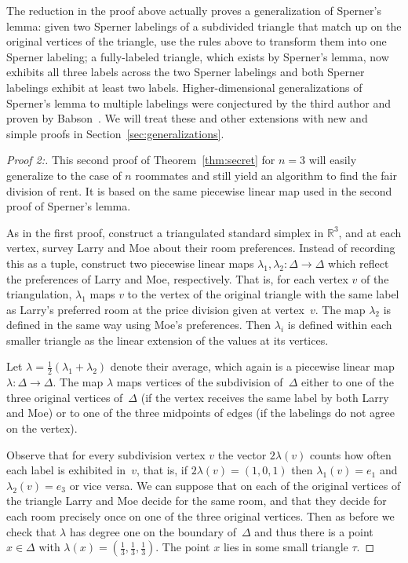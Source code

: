 \documentclass[a4paper,10pt,reqno, english]{amsart}
\theoremstyle{plain}
\theoremstyle{definition}
\newcommand{\R}{\mathbb{R}}
\begin{document}
The reduction in the proof above actually proves a generalization of Sperner's lemma: given two Sperner labelings of a subdivided triangle that
match up on the original vertices of the triangle, use the rules above to transform them into one Sperner labeling; a fully-labeled triangle, which exists
by Sperner's lemma, now exhibits all three labels across the two Sperner labelings and both Sperner labelings exhibit at least two labels.
Higher-dimensional generalizations of Sperner's lemma to multiple labelings were conjectured by the third author and proven by Babson~\cite{babson2012}.
We will treat these and other extensions with new and simple proofs in Section~\ref{sec:generalizations}.

\begin{proof}[Proof 2:]	
	This second proof of Theorem~\ref{thm:secret} for $n=3$ will easily generalize to the case of $n$ roommates and still yield an algorithm to find the fair division of rent. It is based on the same piecewise linear map used in the second proof of Sperner's lemma.
	
	As in the first proof, construct a triangulated standard simplex in $\R^3$, and at each vertex, survey Larry and Moe about their room preferences. Instead of recording this as a tuple, construct two piecewise linear maps $\lambda_1, \lambda_2\colon \Delta \longrightarrow \Delta$ which reflect the preferences of Larry and Moe, respectively. That is, for each vertex $v$ of the triangulation, $\lambda_1$ maps $v$ to the vertex of the original triangle with the same label as Larry's preferred room at the price division given at vertex~$v$. The map $\lambda_2$ is defined in the same way using Moe's preferences. Then $\lambda_i$ is defined within each smaller triangle as the linear extension of the values at its vertices.
	
	Let $\lambda = \frac12(\lambda_1+\lambda_2)$ denote their average, which again is a piecewise linear map $\lambda\colon \Delta \longrightarrow \Delta$.
	The map $\lambda$ maps vertices of the subdivision of~$\Delta$ either to one of the three original vertices of~$\Delta$ (if the vertex receives
	the same label by both Larry and Moe) or to one of the three midpoints of edges (if the labelings do not agree on the vertex).
	
	Observe that for every subdivision vertex $v$ the vector $2\lambda(v)$ counts how often each label is exhibited in~$v$, that is,
	if $2\lambda(v) = (1,0,1)$ then $\lambda_1(v) = e_1$ and $\lambda_2(v) = e_3$ or vice versa.
	We can suppose that on each of the original vertices of the triangle Larry and Moe decide for the same room, and that they 
	decide for each room precisely once on one of the three original vertices.
	Then as before we check that $\lambda$ has degree one on the boundary of~$\Delta$ and thus there is a point $x \in \Delta$ with
	$\lambda(x) = (\frac13, \frac13, \frac13)$. The point $x$ lies in some small triangle $\tau$. 
	

\end{proof}
\end{document}
